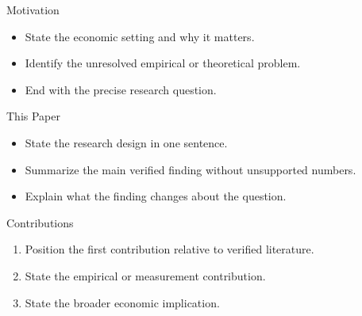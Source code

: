 \begin{frame}{Motivation}
  \begin{itemize}
    \item State the economic setting and why it matters.
    \item Identify the unresolved empirical or theoretical problem.
    \item End with the precise research question.
  \end{itemize}
\end{frame}

\begin{frame}{This Paper}
  \begin{itemize}
    \item State the research design in one sentence.
    \item Summarize the main verified finding without unsupported numbers.
    \item Explain what the finding changes about the question.
  \end{itemize}
\end{frame}

\begin{frame}{Contributions}
  \begin{enumerate}
    \item Position the first contribution relative to verified literature.
    \item State the empirical or measurement contribution.
    \item State the broader economic implication.
  \end{enumerate}
\end{frame}
